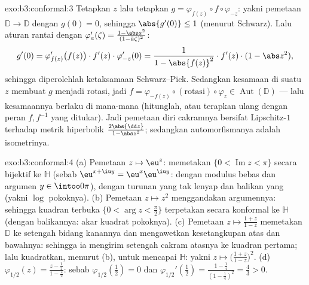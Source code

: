 \begin{solution}{exo:b3:conformal:3}
Tetapkan $z$ lalu tetapkan $g = \varphi_{f(z)}\circ f\circ\varphi_{-z}$:
yakni pemetaan  $\mathbb D \to \mathbb D$ dengan $g(0) = 0$, sehingga
$\abs{g'(0)} \leq 1$ (menurut Schwarz). Lalu aturan rantai dengan
$\varphi_a'(\zeta) = \frac{1 - \abs a^2}{(1 - \bar
a\zeta)^2}$:
\[
g'(0) = \varphi_{f(z)}'\bigl(f(z)\bigr)\cdot f'(z)\cdot
\varphi_{-z}'(0)
= \frac{1}{1 - \abs{f(z)}^2}\cdot f'(z)\cdot(1 - \abs z^2),
\]
sehingga diperolehlah ketaksamaan Schwarz--Pick. Sedangkan kesamaan di suatu $z$
membuat $g$ menjadi rotasi, jadi $f =
\varphi_{-f(z)}\circ(\text{rotasi})\circ\varphi_z \in
\operatorname{Aut}(\mathbb D)$ --- lalu kesamaannya berlaku
di mana-mana (hitunglah, atau terapkan ulang dengan peran $f, f^{-1}$
yang ditukar). Jadi pemetaan diri  cakramnya bersifat
Lipschitz-$1$ terhadap metrik hiperbolik $\frac{2\abs{\dd
z}}{1 - \abs z^2}$; sedangkan automorfismanya adalah isometrinya.
\end{solution}

\begin{solution}{exo:b3:conformal:4}
(a) Pemetaan $z \mapsto \eu^z$: memetakan $\{0 < \operatorname{Im}z <
\pi\}$ secara bijektif ke $\mathbb H$ (sebab $\eu^{x+\iu y} =
\eu^x\eu^{\iu y}$: dengan modulus bebas dan argumen $y \in
\intoo0\pi$),  dengan turunan yang tak lenyap dan
balikan yang  (yakni $\log$ pokoknya).
(b) Pemetaan $z \mapsto z^2$ menggandakan argumennya: sehingga kuadran terbuka
$\{0 < \arg z < \frac\pi2\}$ terpetakan secara konformal ke $\mathbb
H$ (dengan balikannya: akar kuadrat pokoknya).
(c) Pemetaan $z \mapsto \frac{1 + z}{1 - z}$ memetakan $\mathbb D$ ke
setengah bidang kanannya dan mengawetkan kesetangkupan atas dan bawahnya: sehingga ia
mengirim setengah cakram atasnya ke kuadran pertama; lalu kuadratkan,
menurut (b), untuk mencapai $\mathbb H$: yakni $z \mapsto \bigl(\frac{1
+ z}{1 - z}\bigr)^2$.
(d)  $\varphi_{1/2}(z) = \frac{z -
\frac12}{1 - \frac z2}$: sebab $\varphi_{1/2}(\tfrac12) = 0$ dan
$\varphi_{1/2}'(\tfrac12) = \frac{1 - \frac14}{(1 -
\frac14)^2} = \frac43 > 0$.
\end{solution}

